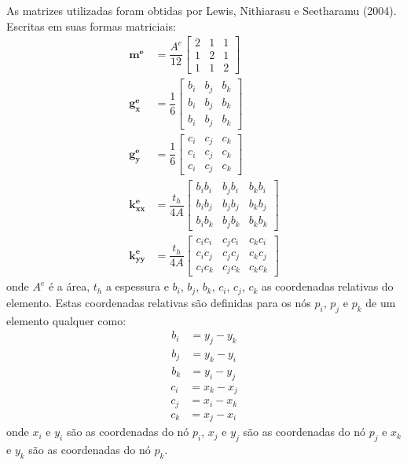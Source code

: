 As matrizes utilizadas foram obtidas por Lewis, Nithiarasu e Seetharamu (2004)\cite{lewis}.
Escritas em suas formas matriciais:
\begin{align}
    \mathbf{m^e} &=
    \dfrac{A^e}{12}
    \begin{bmatrix} 
        2 & 1 & 1 \\
        1 & 2 & 1 \\
        1 & 1 & 2
    \end{bmatrix} \\
    \mathbf{g_x^e} &=
    \dfrac{1}{6}
    \begin{bmatrix} 
        b_i & b_j & b_k \\
        b_i & b_j & b_k \\
        b_i & b_j & b_k
    \end{bmatrix} \\
    \mathbf{g_y^e} &=
    \dfrac{1}{6}
    \begin{bmatrix} 
        c_i & c_j & c_k \\
        c_i & c_j & c_k \\
        c_i & c_j & c_k
    \end{bmatrix} \\
    \mathbf{k_{xx}^e} &=
    \dfrac{t_h}{4A}
    \begin{bmatrix} 
        b_i b_i & b_j b_i & b_k b_i \\
        b_i b_j & b_j b_j & b_k b_j \\
        b_i b_k & b_j b_k & b_k b_k
    \end{bmatrix} \\
    \mathbf{k_{yy}^e} &=
    \dfrac{t_h}{4A}
    \begin{bmatrix} 
        c_i c_i & c_j c_i & c_k c_i \\
        c_i c_j & c_j c_j & c_k c_j \\
        c_i c_k & c_j c_k & c_k c_k
    \end{bmatrix}
\end{align}
onde $A^e$ é a área, $t_h$ a espessura e $b_i$, $b_j$, $b_k$, $c_i$, $c_j$, $c_k$ as coordenadas relativas do elemento.
Estas coordenadas relativas são definidas para os nós $p_i$, $p_j$ e $p_k$ de um elemento qualquer como:
\begin{align}
    b_i &= y_j - y_k \\
    b_j &= y_k - y_i \\
    b_k &= y_i - y_j
\end{align}
\begin{align}
    c_i &= x_k - x_j \\
    c_j &= x_i - x_k \\
    c_k &= x_j - x_i
\end{align}
onde $x_i$ e $y_i$ são as coordenadas do nó $p_i$, $x_j$ e $y_j$ são as coordenadas do nó $p_j$ e $x_k$ e $y_k$ são as coordenadas do nó $p_k$.

